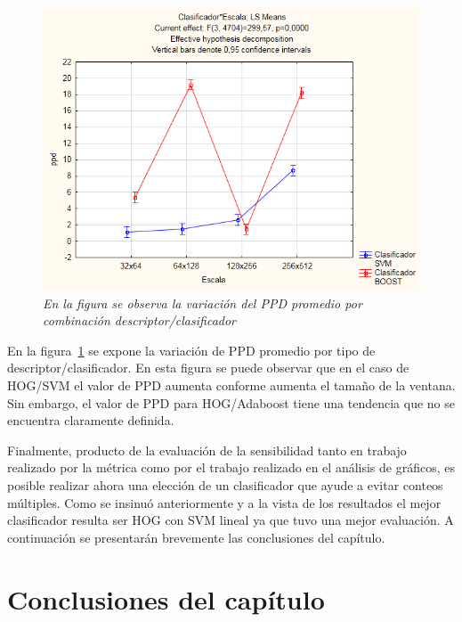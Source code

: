 \begin{figure}[htc]
  \centering
  \includegraphics[scale=.7]{images/csc}
  \caption{\em  En la figura se observa la variación del PPD promedio por combinación descriptor/clasificador}  
  \label{fig:ssp}
\end{figure}

En la figura~\ref{fig:ssp} se expone la variación de PPD promedio por tipo de descriptor/clasificador. En esta figura se puede observar que en el caso de HOG/SVM el valor de PPD aumenta conforme aumenta el tamaño de la ventana. Sin embargo, el valor de PPD para HOG/Adaboost tiene una tendencia que no se encuentra claramente definida.


Finalmente, producto de la evaluación de la sensibilidad tanto en trabajo realizado por la métrica como por el trabajo realizado en el análisis de gráficos, es posible realizar ahora una elección de un clasificador que ayude a evitar conteos múltiples. Como se insinuó anteriormente y a la vista de los resultados el mejor clasificador resulta ser HOG con SVM lineal ya que tuvo una mejor evaluación. 
A continuación se presentarán brevemente las conclusiones del capítulo.

\section{Conclusiones del capítulo}
\label{analisis:conclusiones}

